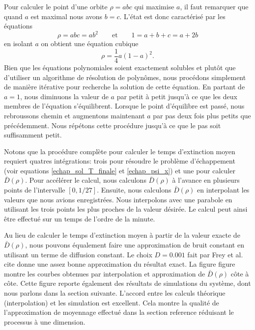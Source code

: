 \documentclass[openany,a4paper,12pt]{article}
\begin{document}
\par Pour calculer le point d'une orbite $\rho = abc$ qui maximise $a$, il faut remarquer que quand $a$ est maximal nous avons $b=c$. L'état est donc caractérisé par les équations 
%
\begin{equation}\label{syst_a_max}
	\rho = abc = ab^2  \qquad \text{et} \qquad 1 = a+b+c = a+2b
\end{equation}
%
en isolant $a$ on obtient une équation cubique 
%
\begin{equation}\label{eq_a_max}
	\rho = \frac 14 a (1-a)^2.
\end{equation}
%
Bien que les équations polynomiales soient exactement solubles et plutôt que d'utiliser un algorithme de résolution de polynômes, nous procédons simplement de manière itérative pour recherche la solution de cette équation. En partant de $a=1$, nous diminuons la valeur de $a$ par petit à petit jusqu'à ce que les deux membres de l'équation s'équilibrent. Lorsque le point d'équilibre est passé, nous rebroussons chemin et augmentons maintenant $a$ par pas deux fois plus petits que précédemment. Nous répétons cette procédure jusqu'à ce que le pas soit suffisamment petit.

\par Notons que la procédure complète pour calculer le temps d'extinction moyen requiert quatres intégrations: trois pour résoudre le problème d'échappement (voir equations \ref{echap_sol_T_finale} et \ref{echap_psi_x}) et une pour calculer $\bar D(\rho)$. Pour accélérer le calcul, nous calculons $\bar D(\rho)$ à l'avance en plusieurs points de l'intervalle $[0,1/27]$. Ensuite, nous calculons $\bar D(\rho)$ en interpolant les valeurs que nous avions enregistrées. Nous interpolons avec une parabole en utilisant les trois points les plus proches de la valeur désirée. Le calcul peut ainsi être effectué sur un temps de l'ordre de la minute.

\par Au lieu de calculer le temps d'extinction moyen à partir de la valeur exacte de $\bar D(\rho)$, nous pouvons équalement faire une approximation de bruit constant en utilisant un terme de diffusion constant. Le choix $D=0.001$ fait par Frey et al. {\color{red} cite} donne une assez bonne approximation du résultat exact. La figure {\color{red} figure} montre les courbes obtenues par interpolation et approximation de $\bar D(\rho)$ côte à côte. Cette figure reporte également des résultats de simulations du système, dont nous parlons dans la section suivante. L'accord entre les calculs théorique (interpolation) et les simulation est excellent. Cela montre la qualité de l'approximation de moyennage effectué dans la section {\color{red} reference} réduisant le processus à une dimension.
\end{document}
